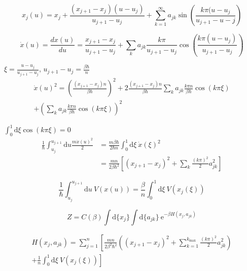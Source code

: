 \documentclass[11 pt]{article}
\begin{document}
  \begin{equation}
    x_j(u) = x_j + \frac{(x_{j+1}-x_j)(u-u_j)}{u_{j+1}-u_j} + \sum^{\infty}_{k=1} a_{jk}\sin\left(
      \frac{k\pi(u-u_j}{u_{j+1}-u-j}\right)
  \end{equation}
  

  \begin{equation}
    \dot{x}(u) = \frac{dx(u)}{du} = \frac{x_{j+1}-x_j}{u_{j+1}-u_j} + \sum_k a_{jk} \frac{k\pi}{u_{j+1}-u_j}
    \cos\left( \frac{k\pi(u-u_j)}{u_{j+1}-u_j}\right)
  \end{equation}
 
  $\xi = \frac{u-u_j}{u_{j+1}-u_j}$, $u_{j+1}-u_j = \frac{\beta\hbar}{n}$
  \begin{multline}
    \dot{x}(u)^2 = \left(\frac{(x_{j+1}-x_j)n}{\beta\hbar}\right)^2 + 
    2\frac{(x_{j+1}-x_j)n}{\beta\hbar} 
    \sum_k a_{jk} \frac{k\pi n}{\beta\hbar}
    \cos\left( k\pi\xi\right) \\
    +\left(\sum_k a_{jk} \frac{k\pi n}{\beta\hbar}
    \cos\left(k\pi\xi\right)\right)^2
  \end{multline}
  

  $\int_0^1 \mathrm{d}\xi \cos(k\pi\xi) = 0$
  \begin{equation}
    \begin{split}
      \frac{1}{\hbar}\int_{u_j}^{u_{j+1}} \mathrm{d}u \frac{m\dot{x}(u)^2}{2} 
        &= \frac{m\beta\hbar}{2\hbar n}
        \int_0^1\mathrm{d}\xi\ \dot{x}(\xi)^2 \\
        &= \frac{mn}{2\beta\hbar^2}\left[(x_{j+1}-x_j)^2 + \sum_k \frac{(k\pi)^2}{2}a_{jk}^2\right]
    \end{split}
  \end{equation}
   
    \begin{equation}
      \frac{1}{\hbar}\int_{u_j}^{u_{j+1}}\mathrm{d}u\ V(x(u)) = \frac{\beta}{n}\int_0^1\mathrm{d}\xi\ V(x_j(\xi))
    \end{equation}
    
  \begin{equation}
    Z = C(\beta)\int\mathrm{d}\{x_j\}\int\mathrm{d}\{a_{jk}\}\ \mathrm{e}^{-\beta H(x_j,a_{jk})}
  \end{equation}

  
  \begin{multline}
    H(x_j,a_{jk})= \sum_{j=1}^{n} \left[ \frac{mn}{2\beta^2\hbar^2}\left((x_{j+1}-x_j)^2 + \sum^{k_\mathrm{max}}_{k=1}
      \frac{(k\pi)^2}{2}a_{jk}^2\right) \right. \\ \left.   + \frac{1}{n}\int_0^1\mathrm{d}\xi\ V(x_j(\xi))\right]
  \end{multline}
\end{document}
